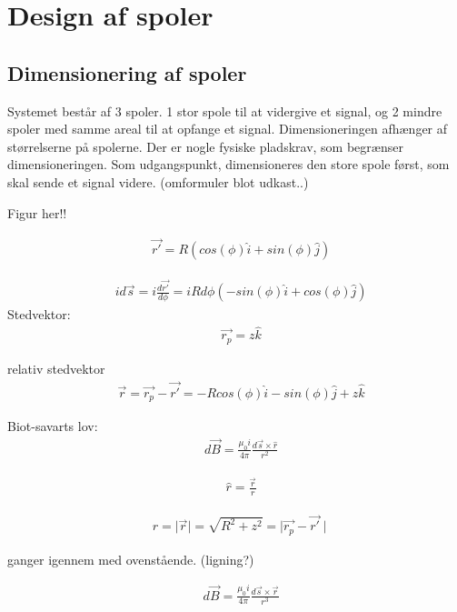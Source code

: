 \section{Design af spoler}\label{sec:sec_spole_design}

\subsection{Dimensionering af spoler}

Systemet består af 3 spoler. 1 stor spole til at vidergive et signal, og 2 mindre spoler med samme areal til at opfange et signal. Dimensioneringen afhænger af størrelserne på spolerne. Der er nogle fysiske pladskrav, som begrænser dimensioneringen. Som udgangspunkt, dimensioneres den store spole først, som skal sende et signal videre. (omformuler blot udkast..)

Figur her!!

 \begin{align}
 	&\vec{r'}=R(cos(\phi)\hat{i}+sin(\phi)\hat{j})
 \end{align}

\begin{align}
	&id\vec{s}=i\frac{d\vec{r'}}{d\phi}=i R d\phi (-sin(\phi)\hat{i}+cos(\phi)\hat{j})
\end{align}
Stedvektor:
\begin{align}
	&\vec{r_p}=z\hat{k}
\end{align}

relativ stedvektor
\begin{align}
	&\vec{r}=\vec{r_p}-\vec{r'}=-R cos(\phi)\hat{i}-sin(\phi)\hat{j}+z\hat{k}
\end{align}

Biot-savarts lov:
\begin{align}
	&d\vec{B}=\frac{\mu_0  i}{4\pi} \frac{d\vec{s} \times \hat{r}}{r^2}
\end{align}

\begin{align}
	&\hat{r}=\frac{\vec{r}}{r}
\end{align}

\begin{align}
	&r= \mid \vec{r} \mid = \sqrt{R^2+z^2}=\mid \vec{r_p}-\vec{r'} \mid
\end{align}



ganger igennem med ovenstående. (ligning?)

\begin{align}
	&d\vec{B}=\frac{\mu_0 i}{4\pi} \frac{d\vec{s} \times \vec{r}}{r^3}
\end{align}


